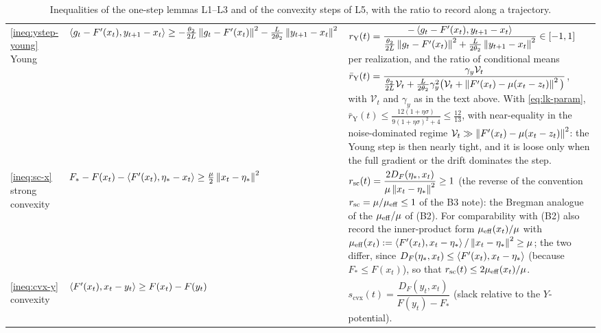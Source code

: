 \begin{table}[htbp]
\begin{tabular}{p{2.2cm}p{5.6cm}p{7.3cm}}
\eqref{ineq:ystep-young} Young & $\left\langle g_t-F'(x_t), y_{t+1}-x_t \right\rangle\ge-\frac{\theta_2}{2L}\left\|g_t-F'(x_t)\right\|^2-\frac L{2\theta_2}\left\|y_{t+1}-x_t\right\|^2$ & $r_{\mathrm{Y}}(t)=\dfrac{-\left\langle g_t-F'(x_t), y_{t+1}-x_t \right\rangle}{\frac{\theta_2}{2L}\left\|g_t-F'(x_t)\right\|^2+\frac L{2\theta_2}\left\|y_{t+1}-x_t\right\|^2}\in[-1,1]$ per realization, and the ratio of conditional means $\bar r_{\mathrm Y}(t)=\dfrac{\gamma_y\mathcal V_t}{\frac{\theta_2}{2L}\mathcal V_t+\frac L{2\theta_2}\gamma_y^2\big(\mathcal V_t+\left\|F'(x_t)-\mu(x_t-z_t)\right\|^2\big)}$, with $\mathcal V_t$ and $\gamma_y$ as in the text above. With \eqref{eq:lk-param}, $\bar r_{\mathrm Y}(t)\le\frac{12(1+\eta\sigma)}{9(1+\eta\sigma)^2+4}\le\frac{12}{13}$, with near-equality in the noise-dominated regime $\mathcal V_t\gg\left\|F'(x_t)-\mu(x_t-z_t)\right\|^2$: the Young step is then nearly tight, and it is loose only when the full gradient or the drift dominates the step. \\
\eqref{ineq:sc-x} strong convexity & $F_\ast-F(x_t)-\left\langle F'(x_t), \eta_\ast-x_t \right\rangle\ge\frac\mu2\left\|x_t-\eta_\ast\right\|^2$ & $r_{\mathrm{sc}}(t)=\dfrac{2D_F(\eta_\ast,x_t)}{\mu\left\|x_t-\eta_\ast\right\|^2}\ge1$ (the reverse of the convention $r_{\mathrm{sc}}=\mu/\mu_{\mathrm{eff}}\le1$ of the B3 note): the Bregman analogue of the $\mu_{\mathrm{eff}}/\mu$ of (B2). For comparability with (B2) also record the inner-product form $\mu_{\mathrm{eff}}(x_t)/\mu$ with $\mu_{\mathrm{eff}}(x_t):=\left\langle F'(x_t), x_t-\eta_\ast \right\rangle/\left\|x_t-\eta_\ast\right\|^2\ge\mu$; the two differ, since $D_F(\eta_\ast,x_t)\le\left\langle F'(x_t), x_t-\eta_\ast \right\rangle$ (because $F_\ast\le F(x_t)$), so that $r_{\mathrm{sc}}(t)\le2\mu_{\mathrm{eff}}(x_t)/\mu$. \\
\eqref{ineq:cvx-y} convexity & $\left\langle F'(x_t), x_t-y_t \right\rangle\ge F(x_t)-F(y_t)$ & $s_{\mathrm{cvx}}(t)=\dfrac{D_F(y_t,x_t)}{F(y_t)-F_\ast}$ (slack relative to the $Y$-potential). \\
\hline
\end{tabular}
\caption{Inequalities of the one-step lemmas L1--L3 and of the convexity steps of L5, with the ratio to record along a trajectory.}
\label{tab:lk-instrument}
\end{table}

